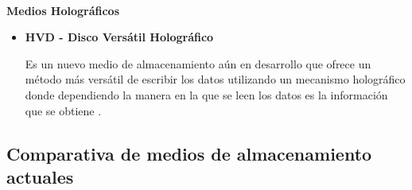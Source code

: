 \textbf{\\ Medios Hologr\'{a}ficos \\}

\begin{itemize}

  \item \textbf{HVD - Disco Vers\'{a}til Hologr\'{a}fico}

Es un nuevo medio de almacenamiento a\'{u}n en desarrollo que ofrece un m\'{e}todo m\'{a}s vers\'{a}til de escribir los datos utilizando un mecanismo hologr\'{a}fico donde dependiendo la manera en la que se leen los datos es la informaci\'{o}n que se obtiene \cite{_worlds_2004}.

\end{itemize}

      \subsection {Comparativa de medios de almacenamiento actuales}

